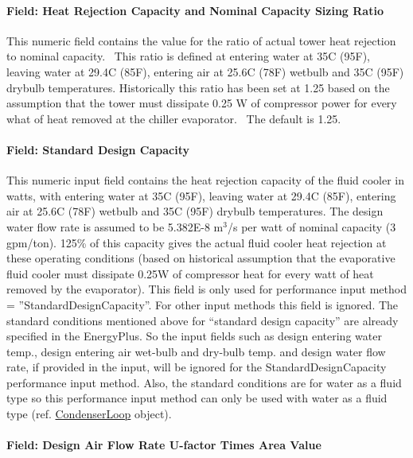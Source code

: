 \paragraph{Field: Heat Rejection Capacity and Nominal Capacity Sizing Ratio}\label{field-heat-rejection-capacity-and-nominal-capacity-sizing-ratio-3}

This numeric field contains the value for the ratio of actual tower heat rejection to nominal capacity.~ This ratio is defined at entering water at 35C (95F), leaving water at 29.4C (85F), entering air at 25.6C (78F) wetbulb and 35C (95F) drybulb temperatures. Historically this ratio has been set at 1.25 based on the assumption that the tower must dissipate 0.25 W of compressor power for every what of heat removed at the chiller evaporator.~ The default is 1.25.

\paragraph{Field: Standard Design Capacity}\label{field-standard-design-capacity}

This numeric input field contains the heat rejection capacity of the fluid cooler in watts, with entering water at 35C (95F), leaving water at 29.4C (85F), entering air at 25.6C (78F) wetbulb and 35C (95F) drybulb temperatures. The design water flow rate is assumed to be 5.382E-8 m\(^{3}\)/s per watt of nominal capacity (3 gpm/ton). 125\% of this capacity gives the actual fluid cooler heat rejection at these operating conditions (based on historical assumption that the evaporative fluid cooler must dissipate 0.25W of compressor heat for every watt of heat removed by the evaporator). This field is only used for performance input method = ''StandardDesignCapacity''. For other input methods this field is ignored. The standard conditions mentioned above for ``standard design capacity'' are already specified in the EnergyPlus. So the input fields such as design entering water temp., design entering air wet-bulb and dry-bulb temp. and design water flow rate, if provided in the input, will be ignored for the StandardDesignCapacity performance input method. Also, the standard conditions are for water as a fluid type so this performance input method can only be used with water as a fluid type (ref. \hyperref[condenserloop]{CondenserLoop} object).

\paragraph{Field: Design Air Flow Rate U-factor Times Area Value}\label{field-design-air-flow-rate-u-factor-times-area-value-1}

